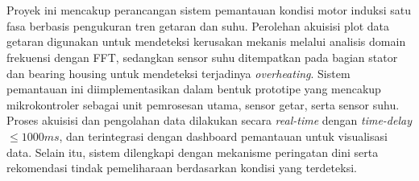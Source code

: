 \documentclass{elsinta}
\begin{document}
\section{\ScopeConstraintsTitle}
\subsection{\ScopeTitle}
Proyek ini mencakup perancangan sistem pemantauan kondisi motor induksi satu fasa berbasis pengukuran tren getaran dan suhu. Perolehan akuisisi plot data getaran digunakan untuk mendeteksi kerusakan mekanis melalui analisis domain frekuensi dengan FFT, sedangkan sensor suhu ditempatkan pada bagian stator dan bearing housing untuk mendeteksi terjadinya \textit{overheating}. Sistem pemantauan ini diimplementasikan dalam bentuk prototipe yang mencakup mikrokontroler sebagai unit pemrosesan utama, sensor getar, serta sensor suhu. Proses akuisisi dan pengolahan data dilakukan secara \textit{real-time} dengan \textit{time-delay} $\leq 1000ms$, dan terintegrasi dengan dashboard pemantauan untuk visualisasi data. Selain itu, sistem dilengkapi dengan mekanisme peringatan dini serta rekomendasi tindak pemeliharaan berdasarkan kondisi yang terdeteksi.

\subsection{\ConstraintsTitle}
\end{document}
